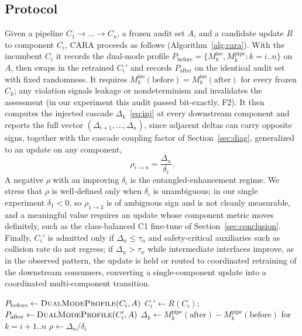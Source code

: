 \documentclass[conference]{IEEEtran}
\begin{document}
\subsection{Protocol}
Given a pipeline $C_1 \to \dots \to C_n$, a frozen audit set $A$, and a
candidate update $R$ to component $C_i$, CARA proceeds as follows
(Algorithm~\ref{alg:cara}). With the incumbent $C_i$ it records the dual-mode
profile $P_{\text{before}} = \{ M_k^{\text{iso}}, M_k^{\text{pipe}} : k=i..n \}$
on $A$, then swaps in the retrained $C_i'$ and records $P_{\text{after}}$ on the
identical audit set with fixed randomness. It requires
$M_k^{\text{iso}}(\text{before}) = M_k^{\text{iso}}(\text{after})$ for every
frozen $C_k$; any violation signals leakage or nondeterminism and invalidates
the assessment (in our experiment this audit passed bit-exactly, F2). It then
computes the injected cascade $\Delta_k$~\eqref{eq:inj} at every downstream
component and reports the full vector $(\Delta_{i+1}, \dots, \Delta_n)$, since
adjacent deltas can carry opposite signs, together with the cascade coupling
factor of Section~\ref{sec:diag}, generalized to an update on any component,
\begin{equation}
\rho_{i \to n} = \frac{\Delta_n}{\delta_i}.
\label{eq:rho}
\end{equation}
A negative $\rho$ with an improving $\delta_i$ is the entangled-enhancement
regime. We stress that $\rho$ is well-defined only when $\delta_i$ is
unambiguous; in our single experiment $\delta_1 < 0$, so $\rho_{1\to 3}$ is of
ambiguous sign and is not cleanly measurable, and a meaningful value requires an
update whose component metric moves definitely, such as the class-balanced C1
fine-tune of Section~\ref{sec:conclusion}. Finally, $C_i'$ is admitted only if
$\Delta_n \le \tau_n$ and safety-critical auxiliaries such as collision rate do
not regress; if $\Delta_n > \tau_n$ while intermediate interfaces improve, as in
the observed pattern, the update is held or routed to coordinated retraining of
the downstream consumers, converting a single-component update into a
coordinated multi-component transition.

\begin{algorithm}[htbp]
\SetAlgoLined
\DontPrintSemicolon
{}
$P_{\text{before}} \leftarrow \textsc{DualModeProfile}(C_i, A)$\;
$C_i' \leftarrow R(C_i)$;\quad
$P_{\text{after}} \leftarrow \textsc{DualModeProfile}(C_i', A)$\;
$\Delta_k \leftarrow M_k^{\text{pipe}}(\text{after})-M_k^{\text{pipe}}(\text{before})$
for $k=i{+}1..n$\;
$\rho \leftarrow \Delta_n / \delta_i$\;
\caption{Cascade-Aware Retraining Assessment (CARA)}
\label{alg:cara}
\end{algorithm}
\end{document}
